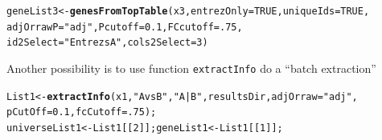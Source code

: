 \documentclass{article}\usepackage[]{graphicx}\usepackage[]{color}
\makeatletter
\newcommand{\hlnum}[1]{\textcolor[rgb]{0.686,0.059,0.569}{#1}}%
\newcommand{\hlstr}[1]{\textcolor[rgb]{0.192,0.494,0.8}{#1}}%
\newcommand{\hlstd}[1]{\textcolor[rgb]{0.345,0.345,0.345}{#1}}%
\newcommand{\hlkwb}[1]{\textcolor[rgb]{0.69,0.353,0.396}{#1}}%
\newcommand{\hlkwc}[1]{\textcolor[rgb]{0.333,0.667,0.333}{#1}}%
\newcommand{\hlkwd}[1]{\textcolor[rgb]{0.737,0.353,0.396}{\textbf{#1}}}%
\newenvironment{kframe}{%
 \def\at@end@of@kframe{}%
 \ifinner\ifhmode%
  \def\at@end@of@kframe{\end{minipage}}%
  \begin{minipage}{\columnwidth}%
 \fi\fi%
 \def\FrameCommand##1{\hskip\@totalleftmargin \hskip-\fboxsep
 \colorbox{shadecolor}{##1}\hskip-\fboxsep
     \hskip-\linewidth \hskip-\@totalleftmargin \hskip\columnwidth}%
 \MakeFramed {\advance\hsize-\width
   \@totalleftmargin\z@ \linewidth\hsize
   \@setminipage}}%
 {\par\unskip\endMakeFramed%
 \at@end@of@kframe}
\newenvironment{knitrout}{}{} %
\makeatother
\begin{document}
\begin{knitrout}
\begin{kframe}
\begin{alltt}
\hlstd{geneList3} \hlkwb{<-} \hlkwd{genesFromTopTable} \hlstd{(x3,} \hlkwc{entrezOnly} \hlstd{=} \hlnum{TRUE}\hlstd{,} \hlkwc{uniqueIds}\hlstd{=}\hlnum{TRUE}\hlstd{,}
                                 \hlkwc{adjOrrawP} \hlstd{=} \hlstr{"adj"}\hlstd{,} \hlkwc{Pcutoff} \hlstd{=} \hlnum{0.1}\hlstd{,} \hlkwc{FCcutoff} \hlstd{=} \hlnum{.75}\hlstd{,}
                                 \hlkwc{id2Select} \hlstd{=} \hlstr{"EntrezsA"} \hlstd{,} \hlkwc{cols2Select} \hlstd{=}\hlnum{3}\hlstd{)}
\end{alltt}
\end{kframe}
\end{knitrout}

Another possibility is to use function \texttt{extractInfo} do a ``batch extraction''

\begin{knitrout}
\color{fgcolor}\begin{kframe}
\begin{alltt}
\hlstd{List1} \hlkwb{<-} \hlkwd{extractInfo}\hlstd{(x1,} \hlstr{"AvsB"}\hlstd{,} \hlstr{"A|B"}\hlstd{, resultsDir,} \hlkwc{adjOrraw}\hlstd{=}\hlstr{"adj"}\hlstd{,}
                     \hlkwc{pCutOff}\hlstd{=}\hlnum{0.1}\hlstd{,} \hlkwc{fcCutoff}\hlstd{=}\hlnum{.75}\hlstd{);}
\hlstd{universeList1} \hlkwb{<-}\hlstd{List1[[}\hlnum{2}\hlstd{]]; geneList1}\hlkwb{<-} \hlstd{List1[[}\hlnum{1}\hlstd{]];}



\end{alltt}
\end{kframe}
\end{knitrout}
\end{document}
